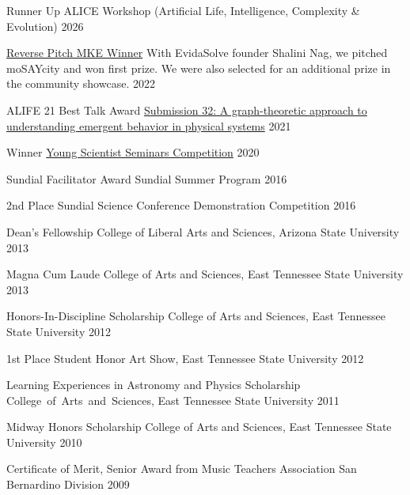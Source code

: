 
\begin{cvhonors}

  \cvhonor
    {Runner Up}
    {ALICE Workshop (Artificial Life, Intelligence, Complexity \& Evolution)}
    {2026}
    {}

  \cvhonor
    {\href{https://www.mketech.org/2022/03/02/the-mke-tech-hub-coalition-announces-reverse-pitch-mke-competition-winners/}{Reverse Pitch MKE Winner}}
    {With EvidaSolve founder Shalini Nag, we pitched moSAYcity and won first prize. We were also selected for an additional prize in the community showcase.}
    {2022}
    {}
    
  \cvhonor
    {ALIFE 21 Best Talk Award}
    {\href{https://www.robot100.cz/awards}{Submission 32: A graph-theoretic approach to understanding emergent behavior in physical systems}}
    {2021}
    {}
    
  \cvhonor
    {Winner}    
    {\href{https://www.ibiology.org/playlists/share-your-research-series/}{Young Scientist Seminars Competition}}
    {2020}
    {}
    
  \cvhonor
    {Sundial Facilitator Award}
    {Sundial Summer Program}
    {2016}
    {}
    
  \cvhonor
    {2nd Place}
    {Sundial Science Conference Demonstration Competition}
    {2016}
    {}
    
  \cvhonor
    {Dean's Fellowship}
    {College of Liberal Arts and Sciences, Arizona State University}
    {2013}
    {}
    
  \cvhonor
    {Magna Cum Laude}
    {College of Arts and Sciences, East Tennessee State University}
    {2013}
    {}
    
  \cvhonor
    {Honors-In-Discipline Scholarship}
    {College of Arts and Sciences, East Tennessee State University}
    {2012}
    {}
    
  \cvhonor
    {1st Place}
    {Student Honor Art Show, East Tennessee State University}
    {2012}
    {}
    
  \cvhonor
    {Learning Experiences in Astronomy and Physics Scholarship}
    {College~of~Arts~and~Sciences, East Tennessee State University}
    {2011}
    {}
    
  \cvhonor
    {Midway Honors Scholarship}
    {College of Arts and Sciences, East Tennessee State University}
    {2010}
    {}
    
  \cvhonor
    {Certificate of Merit, Senior Award from Music Teachers Association}
    {San Bernardino Division}
    {2009}
    {}
    
\end{cvhonors}
